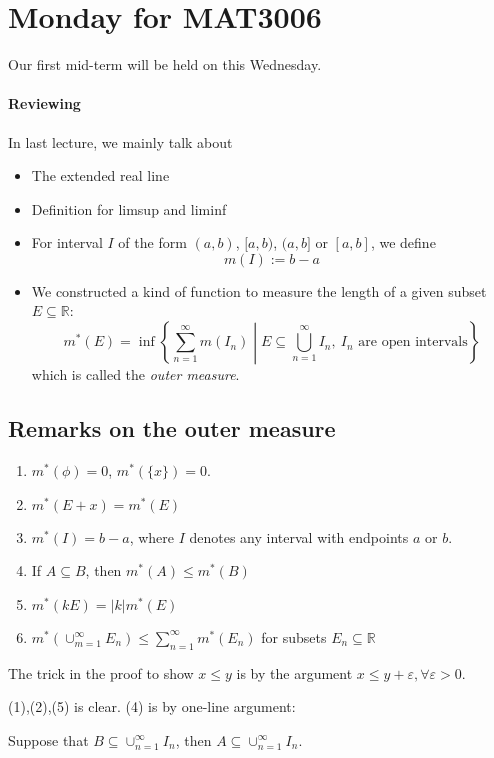 \section{Monday for MAT3006}
Our first mid-term will be held on this Wednesday.
\paragraph{Reviewing}
In last lecture, we mainly talk about
\begin{itemize}
\item
The extended real line
\item
Definition for limsup and liminf
\item
For interval $I$ of the form $(a,b)$, $[a,b)$, $(a,b]$ or $[a,b]$, we define
\[
m(I) := b-a
\]
\item
We constructed a kind of function to measure the length of a given subset $E\subseteq\mathbb{R}$:
\[
m^*(E)=\inf\left\{
\sum_{n=1}^\infty m(I_n)\middle|
E\subseteq\bigcup_{n=1}^\infty I_n,\ \text{$I_n$ are open intervals}
\right\}
\]
which is called the \emph{outer measure}.

\end{itemize}
\subsection{Remarks on the outer measure}
\begin{proposition}\label{pro:7:8}
\begin{enumerate}
\item
$m^*(\phi)=0$, $m^*(\{x\})=0$.
\item
$m^*(E+x) = m^*(E)$
\item
$m^*(I) = b-a$, where $I$ denotes any interval with endpoints $a$ or $b$.
\item
If $A\subseteq B$, then $m^*(A)\le m^*(B)$
\item
$m^*(kE) = |k|m^*(E)$
\item
$m^*(\cup_{m=1}^\infty E_n)\le \sum_{n=1}^\infty m^*(E_n)$ for subsets $E_n\subseteq\mathbb{R}$
\end{enumerate}
\end{proposition}
\begin{remark}
The trick in the proof to show $x\le y$ is by the argument $x\le y+\varepsilon,\forall \varepsilon>0$.
\end{remark}
(1),(2),(5) is clear.
(4) is by one-line argument: 

Suppose that $B\subseteq\cup_{n=1}^\infty I_n$, then $A\subseteq\cup_{n=1}^\infty I_n$.

